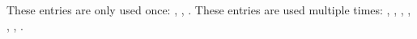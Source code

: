\documentclass[12pt]{article}
\begin{document}
These entries are only used once: , ,
. These entries are used multiple times:
, , , , ,
, . 

\printglossaries 
\end{document}
